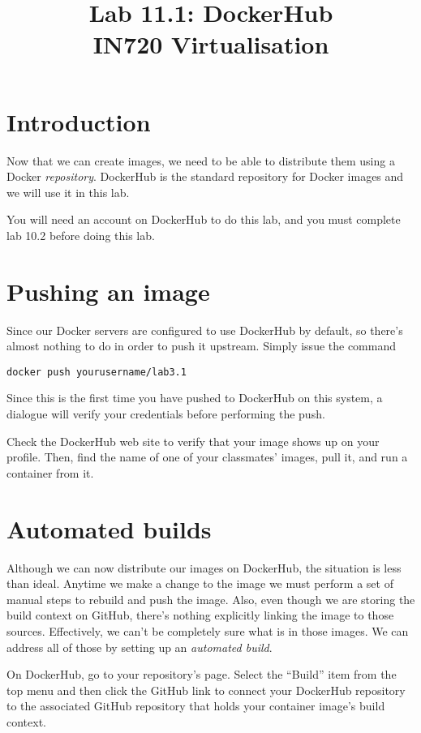 \documentclass{article}
\begin{document}
\title{Lab 11.1: DockerHub\\ IN720 Virtualisation}
\date{}
\maketitle

\section*{Introduction}
Now that we can create images, we need to be able to distribute them using a Docker \emph{repository}.  DockerHub is the standard repository for Docker images and we will use it in this lab.

You will need an account on DockerHub to do this lab, and you must complete lab 10.2 before doing this lab.

\section{Pushing an image}
Since our Docker servers are configured to use DockerHub by default, so there's almost nothing to do in order to push it upstream.  Simply issue the command

\texttt{docker push yourusername/lab3.1}

Since this is the first time you have pushed to DockerHub on this system, a dialogue will verify your credentials before performing the push.

Check the DockerHub web site to verify that your image shows up on your profile.  Then, find the name of one of your classmates' images, pull it, and run a container from it.

\section{Automated builds}
Although we can now distribute our images on DockerHub, the situation is less than ideal.  Anytime we make a change to the image we must perform a set of manual steps to rebuild and push the image.  Also, even though we are storing the build context on GitHub, there's nothing explicitly linking the image to those sources. Effectively, we can't be completely sure what is in those images. We can address all of those by setting up an \emph{automated build}.

On DockerHub, go to your repository's page. Select the ``Build'' item from the top menu and then click the GitHub link to connect your DockerHub repository to the associated GitHub repository that holds your container image's build context.
\end{document}
